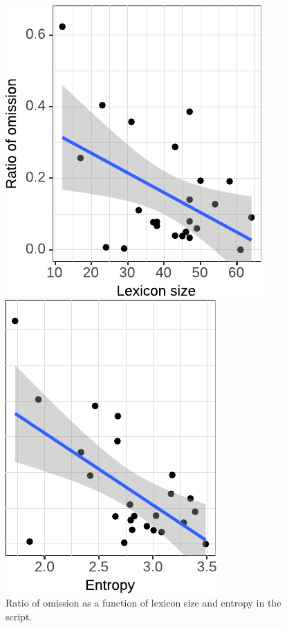 \begin{figure}[t]
\hspace{-1em}\begin{minipage}{.48\textwidth}
  \includegraphics{figures/scr_production_omission_ratio_lexicon}
\end{minipage}
\begin{minipage}{.03\textwidth}
 
\end{minipage}
\begin{minipage}{.48\textwidth}
  \includegraphics{figures/scr_production_omission_ratio_entropy}
\end{minipage}

 \caption{Ratio of omission as a function of lexicon size and entropy in the script.\label{fig:scripts-ellratio-lexicon}}
\end{figure}

